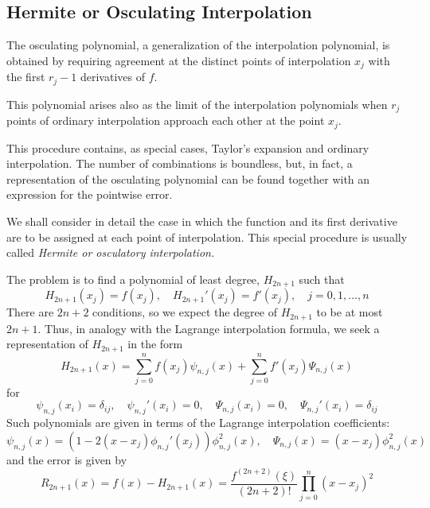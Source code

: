 \documentclass[../main.tex]{subfiles}
\begin{document}
\subsection{Hermite or Osculating Interpolation}
The osculating polynomial, a generalization of the interpolation polynomial, is obtained by requiring agreement at the distinct points of interpolation $x_j$ with the first $r_j-1$ derivatives of $f$.
\begin{remark}
	This polynomial arises also as the limit of the interpolation polynomials when $r_j$ points of ordinary interpolation approach each other at the point $x_j$.
\end{remark}
This procedure contains, as special cases, Taylor's expansion and ordinary interpolation. The number of combinations is boundless, but, in fact, a representation of the osculating polynomial can be found together with an expression for the pointwise error.

We shall consider in detail the case in which the function and its first derivative are to be assigned at each point of interpolation. This special procedure is usually called \emph{Hermite or osculatory interpolation.}

The problem is to find a polynomial of least degree, $H_{2n+1}$ such that
\begin{equation}
	H_{2n+1}(x_j) = f(x_j), \quad H_{2n+1}'(x_j) = f'(x_j), \quad j = 0, 1, \dots, n
\end{equation}
There are $2n+2$ conditions, so we expect the degree of $H_{2n+1}$ to be at most $2n+1$. Thus, in analogy with the Lagrange interpolation formula, we seek a representation of $H_{2n+1}$ in the form
\begin{equation}
	H_{2n+1}(x) = \sum_{j=0}^n f(x_j) \psi_{n,j}(x) + \sum_{j=0}^n f'(x_j) \Psi_{n,j}(x)
\end{equation}
for
\begin{equation}
	\psi_{n,j}(x_i) = \delta_{ij}, \quad \psi_{n,j}'(x_i) = 0, \quad \Psi_{n,j}(x_i) = 0, \quad \Psi_{n,j}'(x_i) = \delta_{ij}
\end{equation}
Such polynomials are given in terms of the Lagrange interpolation coefficients:
\begin{equation}
	\psi_{n,j}(x) = (1 - 2(x - x_j) \phi_{n,j}'(x_j)) \phi_{n,j}^2(x), \quad \Psi_{n,j}(x) = (x - x_j) \phi_{n,j}^2(x)
\end{equation}
and the error is given by
\begin{equation}
	R_{2n+1}(x) = f(x) - H_{2n+1}(x) = \frac{f^{(2n+2)}(\xi)}{(2n+2)!} \prod_{j=0}^n (x - x_j)^2
\end{equation}
\end{document}
